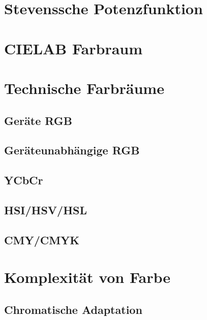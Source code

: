 \documentclass[a4paper, 11pt, accentcolor = tud3b]{tudreport}
\begin{document}
		\section{Stevenssche Potenzfunktion} %

		\section{CIELAB Farbraum} %

		\section{Technische Farbräume} %

			\subsection{Geräte RGB} %

			\subsection{Geräteunabhängige RGB} %

			\subsection{YCbCr} %

			\subsection{HSI/HSV/HSL} %

			\subsection{CMY/CMYK} %

		\section{Komplexität von Farbe} %

			\subsection{Chromatische Adaptation} %
\end{document}
